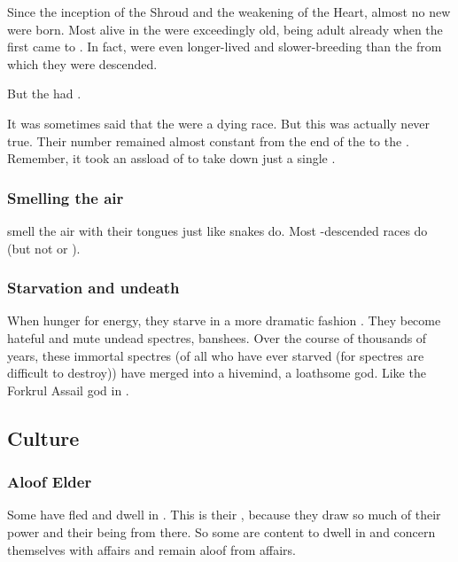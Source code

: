 Since the inception of the Shroud and the weakening of the Heart, almost no new \dragons were born.
Most \dragons alive in the \thirdbanewar were exceedingly old, being adult already when the first \resphain came to \Miith. 
In fact, \dragons were even longer-lived and slower-breeding than the \ophidians from which they were descended. 

But the  had .

It was sometimes said that the \dragons were a dying race.
But this was actually never true. 
Their number remained almost constant from the end of the \secondbanewar to the \thirdbanewar.
Remember, it took an assload of \resphain to take down just a single \dragon.






\subsubsection{Smelling the air}
\Dragons smell the air with their tongues just like snakes do. 
Most \ophidian-descended races do (but not \scathae or \cregorrs). 





\subsubsection{Starvation and undeath}
When \dragons hunger for energy, they starve in a more dramatic fashion . 
They become hateful and mute undead spectres, banshees. 
Over the course of thousands of years, these immortal spectres (of all \dragons who have ever starved (for spectres are difficult to destroy)) have merged into a hivemind, a loathsome god. 
Like the Forkrul Assail god in \cite{StevenErikson:TheCrippledGod}. 










\subsection{Culture}





\subsubsection{Aloof Elder \Dragons}
Some \dragons have fled \Miith and dwell in \Machai. 
This is their , because they draw so much of their power and their being from there.
So some are content to dwell in \Machai and concern themselves with \Machaic affairs and remain aloof from \Miithian affairs. 

